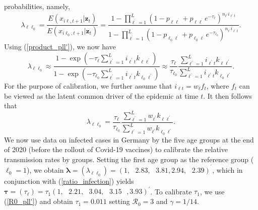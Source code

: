 \documentclass[12pt]{article}
\begin{document}
probabilities, namely,%
\[
\lambda_{\ell\ell_{0}}=\frac{E\left(  x_{i\ell,t+1}|\mathbf{z}_{t}\right)
}{E\left(  x_{i\ell_{0},t+1}|\mathbf{z}_{t}\right)  }=\frac{1-\prod
_{\ell^{^{\prime}}=1}^{L}\left(  1-p_{\ell\ell^{^{\prime}}}+p_{\ell
\ell^{^{\prime}}}e^{-\tau_{\ell}}\right)  ^{n_{\ell^{\prime}}i_{\ell^{\prime
}t}}}{1-\prod_{\ell^{^{\prime}}=1}^{L}\left(  1-p_{\ell_{0}\ell^{^{\prime}}%
}+p_{\ell_{0}\ell^{^{\prime}}}e^{-\tau_{\ell_{0}}}\right)  ^{n_{\ell^{\prime}%
}i_{\ell^{\prime}t}}}.
\]
Using (\ref{product_pll'}), we now have%
\[
\lambda_{\ell\ell_{0}}\approx\frac{1-\exp\left(  -\tau_{\ell}\sum
_{\ell^{\prime}=1}^{L}i_{\ell^{\prime}t}k_{\ell\ell^{\prime}}\right)  }%
{1-\exp\left(  -\tau_{\ell_{0}}\sum_{\ell^{\prime}=1}^{L}i_{\ell^{\prime}%
t}k_{\ell_{0}\ell^{\prime}}\right)  }\approx\frac{\tau_{\ell}}{\tau_{\ell_{0}%
}}\frac{\sum_{\ell^{\prime}=1}^{L}i_{\ell^{\prime}t}k_{\ell\ell^{\prime}}%
}{\sum_{\ell^{\prime}=1}^{L}i_{\ell^{\prime}t}k_{\ell_{0}\ell^{\prime}}}.
\]
For the purpose of calibration, we further assume that $i_{\ell t}=w_{\ell
}f_{t}$, where $f_{t}$ can be viewed as the latent common driver of the
epidemic at time $t$. It then follows that
\begin{equation}
\lambda_{\ell\ell_{0}}=\frac{\tau_{\ell}}{\tau_{\ell_{0}}}\frac{\sum
_{\ell^{\prime}=1}^{L}w_{\ell^{\prime}}k_{\ell\ell^{\prime}}}{\sum
_{\ell^{\prime}=1}^{L}w_{\ell^{\prime}}k_{\ell_{0}\ell^{\prime}}%
}.\label{ratio_infection}%
\end{equation}
We now use data on infected cases in Germany by the five age groups at the end
of 2020 (before the rollout of Covid-19 vaccines) to calibrate the relative
transmission rates by groups. Setting the first age group as the reference
group ($\ell_{0}=1$), we obtain $\boldsymbol{\lambda}=\left(  \lambda
_{\ell\ell_{0}}\right)  =\left(  1,\text{ }2.83,\text{ }3.81,\text{
}2.94,\text{ }2.39\right)  ^{^{\prime}}$, which in conjunction with
(\ref{ratio_infection}) yields $\boldsymbol{\tau}=\left(  \tau_{\ell}\right)
=\tau_{1}\left(  1,\text{ }2.21,\text{ }3.04,\text{ }3.15\text{ },3.93\right)
^{\prime}$. To calibrate $\tau_{1}$, we use (\ref{R0_pll'}) and obtain
$\tau_{1}=0.011$ setting $\mathcal{R}_{0}=3$ and $\gamma=1/14$.
\end{document}
